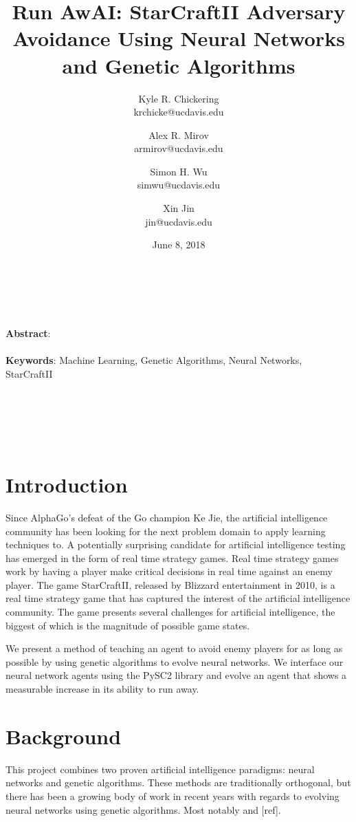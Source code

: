 \documentclass{article}
\title{Run AwAI: StarCraftII Adversary Avoidance Using Neural Networks and
  Genetic Algorithms}
\author{Kyle R. Chickering \\ krchicke@ucdavis.edu
  \and Alex R. Mirov \\ armirov@ucdavis.edu
  \and Simon H. Wu \\ simwu@ucdavis.edu
  \and Xin Jin \\ jin@ucdavis.edu}
\date{June 8, 2018}
\renewenvironment{abstract}
{
\begin{changemargin}{0.5in}{0.5in}
}
{
\end{changemargin}
}
\begin{document}
\maketitle
\hline
\\~\\

\begin{abstract}
  \textbf{Abstract}: \blindtext
  \\~\\
  \textbf{Keywords}: Machine Learning, Genetic Algorithms, Neural Networks,
  StarCraftII
\end{abstract}
\\~\\
\hline
\\~\\

\begin{multicols}{2}
\section{Introduction}
Since AlphaGo's defeat of the Go champion Ke Jie, the artificial intelligence
community has
been looking for the next problem domain to apply learning techniques to. A
potentially surprising candidate for artificial intelligence testing has
emerged in the form of real time strategy games. Real time strategy games work
by having a player make critical decisions in real time against an enemy
player. The game StarCraftII, released by Blizzard entertainment in 2010, is a
real time strategy
game that has captured the interest of the artificial intelligence community.
The game presents several challenges for artificial intelligence, the biggest of
which is the magnitude of possible game states.

We present a method of teaching an agent to avoid enemy players for as long as
possible by using genetic algorithms to evolve neural networks. We interface
our neural network agents using the PySC2 library  and evolve an agent that
shows a measurable increase in its ability to run away.

\section{Background}
This project combines two proven artificial intelligence paradigms: neural
networks and genetic algorithms. These methods are traditionally orthogonal,
but there has been a growing body of work in recent years with regards to
evolving neural networks using genetic algorithms. Most notably \cite{NEAT} and
[ref].


\end{multicols}
\end{document}
